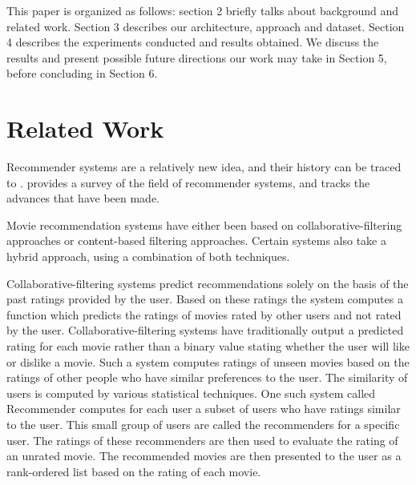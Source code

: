 \documentclass[conference]{IEEEtran}
\begin{document}
This paper is organized as follows: section 2 briefly talks about background and related work. Section 3 describes our architecture, approach and dataset. Section 4 describes the experiments conducted and results obtained. We discuss the results and present possible future directions our work may take in Section 5, before concluding in Section 6.  



\section{Related Work}
Recommender systems are a relatively new idea, and their history can be traced to \cite{resnick1997recommender}. \cite{adomavicius2005toward} provides a survey of the field of recommender systems, and tracks the advances that have been made. 

Movie recommendation systems have either been based on collaborative-filtering approaches or content-based filtering approaches. Certain systems also take a hybrid approach, using a combination of both techniques. 

Collaborative-filtering systems predict recommendations solely on the basis of the past ratings provided by the user. Based on these ratings the system computes a function which predicts the ratings of movies rated by other users and not rated by the user. Collaborative-filtering systems have traditionally output a predicted rating for each movie rather than a binary value stating whether the user will like or dislike a movie. Such a system computes ratings of unseen movies based on the ratings of other people who have similar preferences to the user. The similarity of users is computed by various statistical techniques. One such system called Recommender \cite{basu1998recommendation} computes for each user a subset of users who have ratings similar to the user. This small group of users are called the recommenders for a specific user. The ratings of these recommenders are then used to evaluate the rating of an unrated movie. The recommended movies are then presented to the user as a rank-ordered list based on the rating of each movie.
\end{document}
